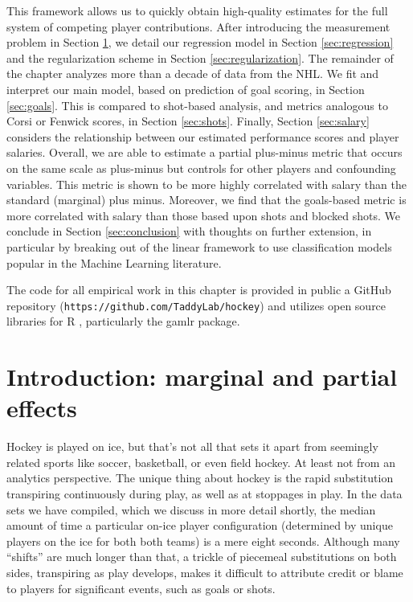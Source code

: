 This framework allows us to quickly obtain high-quality estimates for the full
system of competing player contributions. After introducing the  measurement
problem in Section \ref{sec:intro}, we detail our regression model in Section
\ref{sec:regression} and the regularization scheme in Section
\ref{sec:regularization}.  The remainder of the chapter analyzes more than a
decade of data from the NHL.  We fit and interpret our main model, based on
prediction of goal scoring, in Section \ref{sec:goals}.  This is compared to
shot-based analysis, and metrics analogous to Corsi or Fenwick scores, in
Section \ref{sec:shots}.  Finally, Section \ref{sec:salary} considers the
relationship between our estimated  performance scores and  player salaries.
Overall, we are able to estimate a partial plus-minus metric that occurs on
the same scale as plus-minus but controls for other players and confounding
variables.  This metric is shown to be more highly correlated with salary than
the standard (marginal) plus minus.  Moreover, we find that the goals-based
metric is more correlated with salary than those based upon shots and blocked
shots.   We conclude in Section \ref{sec:conclusion} with thoughts on further
extension, in particular by breaking out of the linear framework to use
classification models popular in the Machine Learning literature.

The code for all empirical work in this chapter is provided in public a GitHub
repository (\verb!https://github.com/TaddyLab/hockey!) and utilizes open
source libraries for {\sf R} \cite{cranR}, particularly the {\sf gamlr} \cite{gamlr} package. 


\section{Introduction: marginal and partial effects}
\label{sec:intro}

Hockey is played on ice, but that's not all that sets it apart from seemingly
related  sports like soccer, basketball, or even field hockey.  At least not
from an analytics perspective.  The unique thing about hockey is the rapid
substitution transpiring continuously during play, as well as at stoppages in
play.  In the data sets we have compiled, which we discuss in more detail
shortly, the median amount of time a particular on-ice player configuration
(determined by unique players on the ice for both both teams) is a mere eight
seconds. Although many ``shifts'' are much longer than that, a trickle of
piecemeal substitutions on both sides, transpiring as play develops, makes it
difficult to attribute credit or blame to players for significant events, such
as goals or shots.

